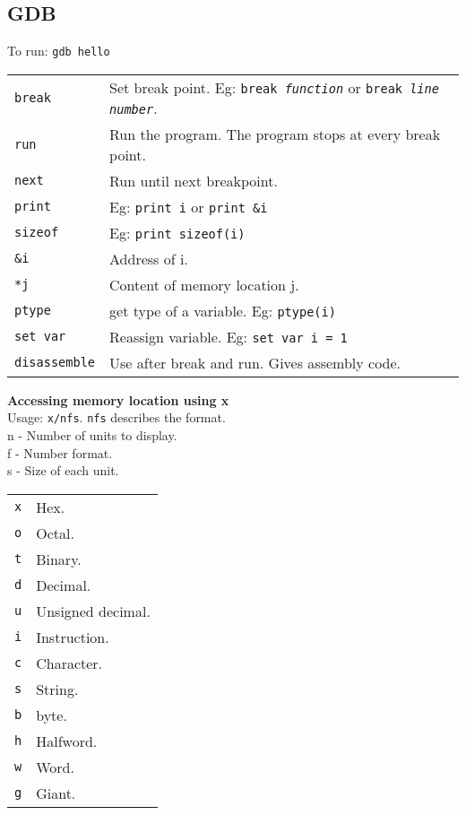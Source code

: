 \begin{multicols*}{3}
\subsection{GDB}
To run: \texttt{gdb hello}\\
\begin{tabularx}{\linewidth}{lX}
\texttt{break} & Set break point. Eg: \texttt{break \textit{function}} or \texttt{break \textit{line number}}.\\
\texttt{run} & Run the program. The program stops at every break point.\\
\texttt{next} & Run until next breakpoint.\\
\texttt{print} & Eg: \texttt{print i} or \texttt{print \&i}\\
\texttt{sizeof} & Eg: \texttt{print sizeof(i)}\\
\texttt{\&i} & Address of i.\\
\texttt{*j} & Content of memory location j.\\
\texttt{ptype} & get type of a variable. Eg: \texttt{ptype(i)}\\
\texttt{set var} & Reassign variable. Eg: \texttt{set var i = 1}\\
\texttt{disassemble} & Use after break and run. Gives assembly code.\\
\end{tabularx}

\textbf{Accessing memory location using x}\\
Usage: \texttt{x/nfs}. \texttt{nfs} describes the format.\\
n - Number of units to display.\\
f - Number format.\\
s - Size of each unit.\\
\begin{tabularx}{\linewidth}{lX}
\hline
\texttt{x} & Hex.\\
\texttt{o} & Octal.\\
\texttt{t} & Binary.\\
\texttt{d} & Decimal.\\
\texttt{u} & Unsigned decimal.\\
\texttt{i} & Instruction.\\
\texttt{c} & Character.\\
\texttt{s} & String.\\
\hline
\texttt{b} & byte.\\
\texttt{h} & Halfword.\\
\texttt{w} & Word.\\
\texttt{g} & Giant.\\
\hline
\end{tabularx}


\end{multicols*}
